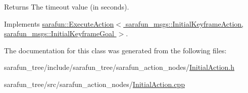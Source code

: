 \begin{DoxyReturn}{Returns}
The timeout value (in seconds). 
\end{DoxyReturn}


Implements \hyperlink{classsarafun_1_1ExecuteAction_aba6cfa8a8ce19e735eb6394424df6d17}{sarafun\-::\-Execute\-Action$<$ sarafun\-\_\-msgs\-::\-Initial\-Keyframe\-Action, sarafun\-\_\-msgs\-::\-Initial\-Keyframe\-Goal $>$}.



The documentation for this class was generated from the following files\-:\begin{DoxyCompactItemize}
\item 
sarafun\-\_\-tree/include/sarafun\-\_\-tree/sarafun\-\_\-action\-\_\-nodes/\hyperlink{InitialAction_8h}{Initial\-Action.\-h}\item 
sarafun\-\_\-tree/src/sarafun\-\_\-action\-\_\-nodes/\hyperlink{InitialAction_8cpp}{Initial\-Action.\-cpp}\end{DoxyCompactItemize}
